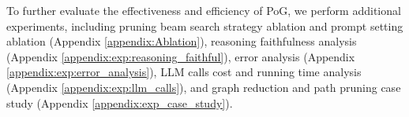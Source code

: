 To further evaluate the effectiveness and efficiency of PoG, we perform additional experiments, including pruning beam search strategy ablation and prompt setting ablation (Appendix \ref{appendix:Ablation}), reasoning faithfulness analysis (Appendix \ref{appendix:exp:reasoning_faithful}), error analysis (Appendix \ref{appendix:exp:error_analysis}), LLM calls cost and running time analysis (Appendix \ref{appendix:exp:llm_calls}), and graph reduction and path pruning case study (Appendix \ref{appendix:exp_case_study}). 



